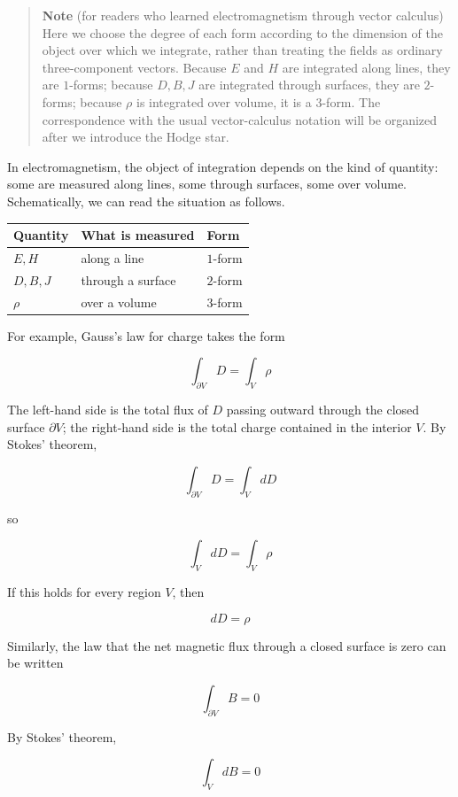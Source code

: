 \begin{quote}
\textbf{Note} (for readers who learned electromagnetism through vector
calculus) Here we choose the degree of each form according to the
dimension of the object over which we integrate, rather than treating
the fields as ordinary three-component vectors. Because \(E\) and \(H\)
are integrated along lines, they are \(1\)-forms; because \(D,B,J\) are
integrated through surfaces, they are \(2\)-forms; because \(\rho\) is
integrated over volume, it is a \(3\)-form. The correspondence with the
usual vector-calculus notation will be organized after we introduce the
Hodge star.
\end{quote}

In electromagnetism, the object of integration depends on the kind of
quantity: some are measured along lines, some through surfaces, some
over volume. Schematically, we can read the situation as follows.

\begin{longtable}[]{@{}lll@{}}
\toprule\noalign{}
Quantity & What is measured & Form \\
\midrule\noalign{}
\endhead
\bottomrule\noalign{}
\endlastfoot
\(E,H\) & along a line & \(1\)-form \\
\(D,B,J\) & through a surface & \(2\)-form \\
\(\rho\) & over a volume & \(3\)-form \\
\end{longtable}

For example, Gauss's law for charge takes the form

\[
\int_{\partial V}D=\int_V\rho
\]

The left-hand side is the total flux of \(D\) passing outward through
the closed surface \(\partial V\); the right-hand side is the total
charge contained in the interior \(V\). By Stokes' theorem,

\[
\int_{\partial V}D=\int_V dD
\]

so

\[
\int_V dD=\int_V\rho
\]

If this holds for every region \(V\), then

\[
dD=\rho
\]

Similarly, the law that the net magnetic flux through a closed surface
is zero can be written

\[
\int_{\partial V}B=0
\]

By Stokes' theorem,

\[
\int_V dB=0
\]

